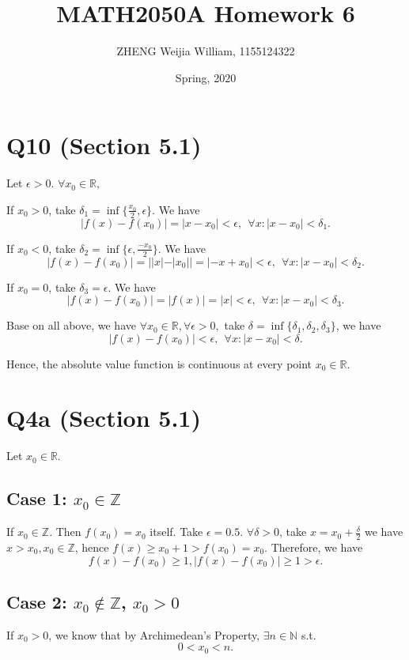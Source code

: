 \documentclass[12pt]{article}%
\begin{document}
\title{MATH2050A Homework 6}
\author{ZHENG Weijia William, 1155124322}
\date{Spring, 2020}
\maketitle

\section{Q10 (Section 5.1)}
Let $\epsilon>0$. $\forall x_0 \in \mathbb{R},$

If $x_0>0$, take $\delta_1 = \inf{\{\frac{x_0}{2},\epsilon\}}.$ We have $$|f(x)-f(x_0)| = |x-x_0|<\epsilon,~~ \forall x:|x-x_0|<\delta_1.$$

If $x_0<0$, take $\delta_2 = \inf{ \{ \epsilon, \frac{-x_0}{2}  \} }$. We have $$|f(x)-f(x_0)| = ||x|-|x_0||=|-x+x_0|<\epsilon, ~~\forall x: |x-x_0|<\delta_2.$$

If $x_0=0$, take $\delta_3 = \epsilon.$ We have $$|f(x)-f(x_0)|=|f(x)|=|x|<\epsilon, ~~\forall x:|x-x_0|<\delta_3.$$

Base on all above, we have $\forall x_0 \in \mathbb{R}, \forall \epsilon>0,$ take $\delta=\inf{\{\delta_1,\delta_2, \delta_3\}}$, we have $$|f(x)-f(x_0)|<\epsilon,~~\forall x: |x-x_0|<\delta.$$

Hence, the absolute value function is continuous at every point $x_0 \in \mathbb{R}.$
~\

\section{Q4a (Section 5.1)}
Let $x_0\in \mathbb{R}.$ 

\subsection{Case 1: $x_0 \in \mathbb{Z}$}

If $x_0\in \mathbb{Z}.$ Then $f(x_0)=x_0$ itself. Take $\epsilon=0.5.$ $\forall \delta>0$, take $x = x_0+\frac{\delta}{2}$ we have $x > x_0, x_0\in \mathbb{Z}$, hence $f(x) \geq x_0+1 > f(x_0)=x_0.$ Therefore, we have $$f(x)-f(x_0)\geq 1, |f(x)-f(x_0)|\geq 1>\epsilon.$$

\subsection{Case 2: $x_0 \not\in \mathbb{Z}$, $x_0>0$}

If $x_0>0$, we know that by Archimedean's Property, $\exists n \in \mathbb{N}$ s.t. $$0<x_0<n.$$
\end{document}
